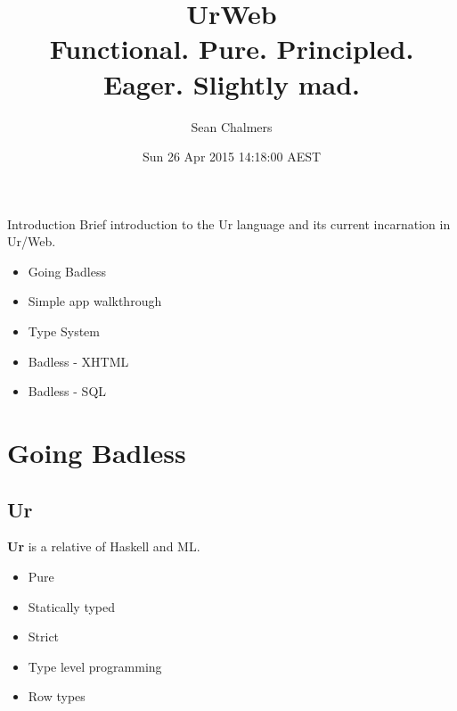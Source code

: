 \documentclass{beamer}
\title[Introduction to UrWeb]{UrWeb\\Functional. Pure. Principled. Eager. Slightly mad.}
\author{Sean Chalmers}
\date{Sun 26 Apr 2015 14:18:00 AEST}
\begin{document}
\begin{frame}
\titlepage
\end{frame}


\begin{frame}{Introduction}
Brief introduction to the Ur language and its current incarnation in Ur/Web.

\begin{itemize}
\item Going Badless
\item Simple app walkthrough
\item Type System
\item Badless - XHTML
\item Badless - SQL
\end{itemize}
\end{frame}

\section{Going Badless}
\subsection{Ur}

\begin{frame}
\textbf{Ur} is a relative of Haskell and ML.

\begin{itemize}
\item Pure
\item Statically typed
\item Strict
\item Type level programming
\item Row types
\end{itemize}
\end{frame}
\end{document}
